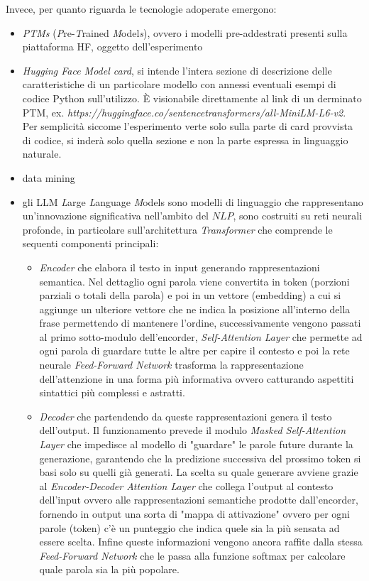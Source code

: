\documentclass{article}
\begin{document}
Invece, per quanto riguarda le tecnologie adoperate emergono:
\begin{itemize}
    \item \textit{PTMs} (\textit{P}re-\textit{T}rained \textit{M}odel\textit{s}), ovvero i modelli pre-addestrati presenti sulla piattaforma HF, oggetto dell'esperimento
    \item \textit{Hugging Face Model card}, si intende l'intera sezione di descrizione delle caratteristiche di un particolare modello con annessi eventuali esempi di codice Python sull'utilizzo. È visionabile direttamente al link di un derminato PTM, ex. \textit{https://huggingface.co/sentencetransformers/all-MiniLM-L6-v2}.\\
    Per semplicità siccome l'esperimento verte solo sulla parte di card provvista di codice, si inderà solo quella sezione e non la parte espressa in linguaggio naturale.
    
    \item data mining
    \item gli LLM \textit{L}arge \textit{L}anguage \textit{M}odels sono modelli di linguaggio che rappresentano un'innovazione significativa nell'ambito del \(NLP\), sono costruiti su reti neurali profonde, in particolare sull'architettura \textit{Transformer} che comprende le sequenti componenti principali:
\begin{itemize}
    \item \textit{Encoder} che elabora il testo in input generando rappresentazioni semantica. Nel dettaglio ogni parola viene convertita in token (porzioni parziali o totali della parola) e poi in un vettore (embedding) a cui si aggiunge un ulteriore vettore che ne indica la posizione all'interno della frase permettendo di mantenere l'ordine, successivamente vengono passati al primo sotto-modulo dell'encorder, \textit{Self-Attention Layer} che permette ad ogni parola di guardare tutte le altre per capire il contesto e poi la rete neurale \textit{Feed-Forward Network} trasforma la rappresentazione dell'attenzione in una forma più informativa ovvero catturando aspettiti sintattici più complessi e astratti.
    
    \item \textit{Decoder} che partendendo da queste rappresentazioni genera il testo dell'output. Il funzionamento prevede il modulo \textit{Masked Self-Attention Layer} che impedisce al modello di "guardare" le parole future durante la generazione, garantendo che la predizione successiva del prossimo token si basi solo su quelli già generati. La scelta su quale generare avviene grazie al \textit{Encoder-Decoder Attention Layer} che collega l'output al contesto dell'input ovvero alle rappresentazioni semantiche prodotte dall'encorder, fornendo in output una sorta di "mappa di attivazione" ovvero per ogni parole (token) c'è un punteggio che indica quele sia la più sensata ad essere scelta. Infine queste informazioni vengono ancora raffite dalla stessa \textit{Feed-Forward Network} che le passa alla funzione softmax per calcolare quale parola sia la più popolare.


\end{itemize}
\end{itemize}
\end{document}

